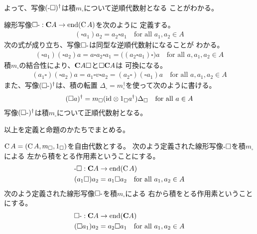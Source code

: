 	よって、写像$(\myhere\square)^\dag$は積$m_\square$について逆順代数射となる
	ことがわかる。

	線形写像$\square\myhere:\mybf{C}A\to\myop{end}(\myop{C}A)$を次のように
	定義する。
	\begin{equation*}\begin{split} %
		(\square a_1)a_2 = a_2\square a_1 \quad\text{for all } a_1,a_2\in A
	\end{split}\end{equation*} %
	次の式が成り立ち、写像$\square\myhere$は同型な逆順代数射になることが
	わかる。
	\begin{equation*}\begin{split} %
		(\square a_1)(\square a_2)a = a\square a_2\square a_1 
		=  \bigl((a_2\square a_1)\square\bigr)a
		\quad\text{for all } a,a_1,a_2\in A
	\end{split}\end{equation*} %
	積$m_\square$の結合性により、${\mathbf{C}}A\square$と$\square{\mathbf{C}}A$は
	可換になる。
	\begin{equation*}\begin{split} %
		(a_1\square)(\square a_2)a
		= a_1\square v\square a_2
		= (a_2\square)(\square a_1)a 
		\quad\text{for all } a,a_1,a_2\in A
	\end{split}\end{equation*} %
	また、写像$(\square\myhere)^\dag$は、積の転置
	$\Delta_\square=m_\square^\dag$を使って次のように書ける。
	\begin{equation*}\begin{split} %
		(\square a)^\dag= m_\square(\myid\otimes 1_\square a^\dag)\Delta_\square
		\quad\text{for all } a\in A
	\end{split}\end{equation*} %
	写像$(\square\myhere)^\dag$は積$m_\square$について正順代数射となる。

	以上を定義と命題のかたちでまとめる。

	\begin{definition}[積による作用素]\label{def:積による作用素} %
		$\operatorname{C}A=(\operatorname{C}A,m_\square,1_\square)$を自由代数とする。
		次のよう定義された線形写像$\myhere\square$を積$m_\square$による
		左から積をとる作用素ということにする。
		\begin{equation*}\begin{split} %
			\myhere\square:\mybf{C}A &\to \myop{end}(\myop{C}A) \\
			(a_1\square)a_2 &= a_1\square a_2 
			\quad\text{for all }a_1,a_2\in A
		\end{split}\end{equation*} %
		次のよう定義された線形写像$\square\myhere$を積$m_\square$による
		右から積をとる作用素ということにする。
		\begin{equation*}\begin{split} %
			\square\myhere:\mybf{C}A &\to \myop{end}(\mybf{C}A) \\
			(\square a_1)a_2 &= a_2\square a_1
			\quad\text{for all }a_1,a_2\in A
		\end{split}\end{equation*} %
	\end{definition} %

